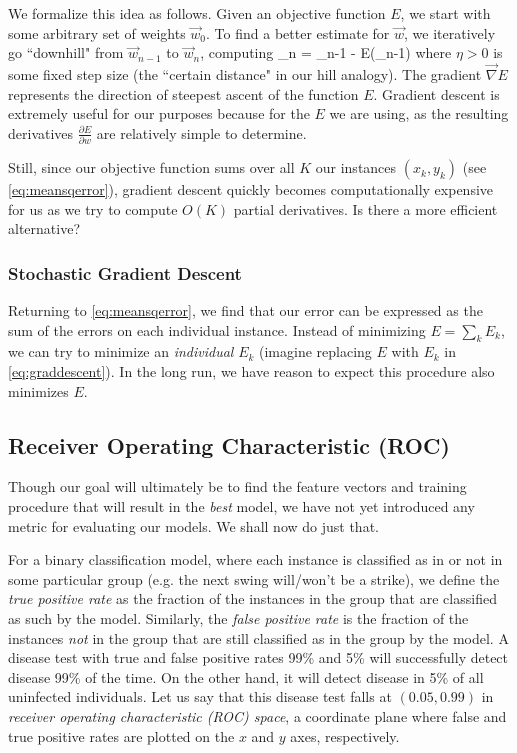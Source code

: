 \documentclass[10pt]{article}
\begin{document}
We formalize this idea as follows.
Given an objective function $E$, we start with some arbitrary set of weights $\vec{w}_0$.
To find a better estimate for $\vec{w}$, we iteratively go ``downhill" from $\vec{w}_{n-1}$ to $\vec{w}_{n}$, computing
\beq
\label{eq:graddescent}
_n = _{n-1} - \eta\vec{\nabla} E(_{n-1})
\eeq
where $\eta > 0$ is some fixed step size (the ``certain distance" in our hill analogy).
The gradient $\vec{\nabla} E$ represents the direction of steepest ascent of the function $E$.
Gradient descent is extremely useful for our purposes because for the $E$ we are using, as the resulting derivatives $\frac{\partial E}{\partial w}$ are relatively simple to determine.

Still, since our objective function sums over all $K$ our instances $(x_k, y_k)$ (see \cref{eq:meansqerror}), gradient descent quickly becomes computationally expensive for us as we try to compute $O(K)$ partial derivatives.
Is there a more efficient alternative?

\subsubsection{Stochastic Gradient Descent}

Returning to \cref{eq:meansqerror}, we find that our error can be expressed as the sum of the errors on each individual instance.
Instead of minimizing $E = \sum_k E_k$, we can try to minimize an \emph{individual} $E_k$ (imagine replacing $E$ with $E_k$ in \cref{eq:graddescent}).
In the long run, we have reason to expect this procedure also minimizes $E$.


\subsection{Receiver Operating Characteristic (ROC)}

Though our goal will ultimately be to find the feature vectors and training procedure that will result in the \emph{best} model, we have not yet introduced any metric for evaluating our models.
We shall now do just that.

For a binary classification model, where each instance is classified as in or not in some particular group (e.g. the next swing will/won't be a strike), we define the \emph{true positive rate} as the fraction of the instances in the group that are classified as such by the model.
Similarly, the \emph{false positive rate} is the fraction of the instances \emph{not} in the group that are still classified as in the group by the model.
A disease test with true and false positive rates 99\% and 5\% will successfully detect disease 99\% of the time.
On the other hand, it will detect disease in 5\% of all uninfected individuals.
Let us say that this disease test falls at $(0.05, 0.99)$ in \emph{receiver operating characteristic (ROC) space}, a coordinate plane where false and true positive rates are plotted on the $x$ and $y$ axes, respectively.
\end{document}
